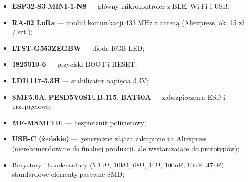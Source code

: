 \begin{itemize}
	\item \textbf{ESP32-S3-MINI-1-N8} — główny mikrokontroler z BLE, Wi-Fi i USB;
	\item \textbf{RA-02 LoRa} — moduł komunikacji 433 MHz z anteną (Aliexpress, ok. 15 zł / szt.);
	\item \textbf{LTST-G563ZEGBW} — dioda RGB LED;
	\item \textbf{1825910-6} — przyciski BOOT i RESET;
	\item \textbf{LDI1117-3.3H} — stabilizator napięcia 3.3V;
	\item \textbf{SMF5.0A}, \textbf{PESD5V0S1UB.115}, \textbf{BAT60A} — zabezpieczenia ESD i przepięciowe;
	\item \textbf{MF-MSMF110} — bezpiecznik polimerowy;
	\item \textbf{USB-C (żeńskie)} — generyczne złącza zakupione na Aliexpress (nierekomendowane do finalnej produkcji, ale wystarczające do prototypów);
	\item Rezystory i kondensatory (5.1kΩ, 10kΩ, 68Ω, 10Ω, 100nF, 10uF, 47uF) – standardowe elementy pasywne SMD;
\end{itemize}
